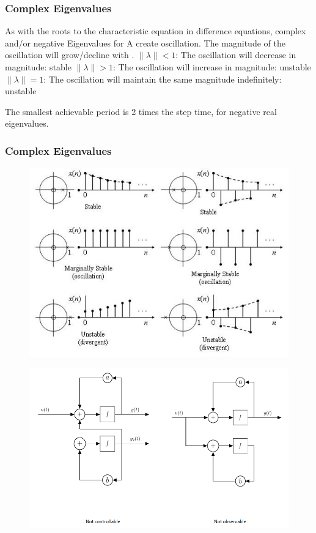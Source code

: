 \begin{frame}
	\frametitle{Complex Eigenvalues }
	As with the roots to the characteristic equation in difference equations, complex and/or negative Eigenvalues for A create oscillation.
	The magnitude of the oscillation will grow/decline with          .
	$\lVert\lambda\rVert < 1$: The oscillation will decrease in magnitude: stable
	$\lVert\lambda\rVert > 1$: The oscillation will increase in magnitude:  unstable
	$\lVert\lambda\rVert = 1$: The oscillation will maintain the same magnitude indefinitely:  unstable
	
	The smallest achievable period is 2 times the step time, for negative real eigenvalues.
	
\end{frame}
\begin{frame}
		\frametitle{Complex Eigenvalues }
		\begin{figure}
			\centering
			\includegraphics[width=0.7\linewidth]{Images/discrete_time_systems_33}
			\label{fig:discrete_time_systems_33}
		\end{figure}
\end{frame}
\begin{frame}
	\begin{figure}
\centering
\includegraphics[width=0.7\linewidth]{Images/discrete_time_systems_34}
\caption{}
\label{fig:discrete_time_systems_34}
\end{figure}
\end{frame}
